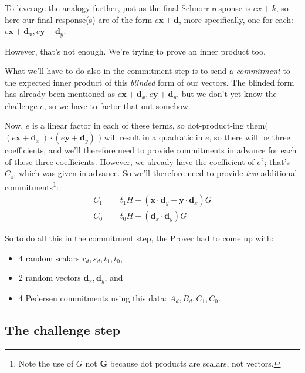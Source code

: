 \documentclass[10pt,a4paper]{article}
\begin{document}
To leverage the analogy further, just as the final Schnorr response is $ex+k$,
so here our final response(s) are of the form $e\mathbf{x}+\mathbf{d}$, more specifically, one for each: $e\mathbf{x} + \mathbf{d}_x, e\mathbf{y}+\mathbf{d}_y$.

However, that's not enough. We're trying to prove an inner product too.

What we'll have to do also in the commitment step is to send a
\emph{commitment} to the expected inner product of this \emph{blinded}
form of our vectors. The blinded form has already been mentioned as $e\mathbf{x} + \mathbf{d}_x, e\mathbf{y}+\mathbf{d}_y$,
but we don't yet know the challenge $e$, so we have to factor that out
somehow.

Now, $e$ is a linear factor in each of these terms, so dot-product-ing them($(e\mathbf{x} + \mathbf{d}_x\ )\cdot (e\mathbf{y} + \mathbf{d}_y)$
) will result in a quadratic in $e$, so there will be three coefficients,
and we'll therefore need to provide commitments in advance for each of
these three coefficients. However, we already have the coefficient of $e^2$;
that's $C_z$, which was given in advance. So we'll therefore need to provide
\emph{two} additional commitments\footnote{Note the use of $G$ not $\mathbf{G}$ because dot products are scalars, not vectors.}:
\begin{align}
C_1 &= t_1 H + \left(\mathbf{x} \cdot \mathbf{d}_y + \mathbf{y} \cdot \mathbf{d}_x\right)G \label{inner_product_proof_C0C1_def:0} \\
C_0 &= t_0 H + \left(\mathbf{d}_x \cdot \mathbf{d}_y \right)G  \label{inner_product_proof_C0C1_def:1}
\end{align}

So to do all this in the commitment step, the Prover had to come up with:

\begin{itemize}
\item 4 random scalars $r_d, s_d, t_1, t_0$,
\item 2 random vectors $\mathbf{d}_x, \mathbf{d}_y$, and 
\item 4 Pedersen commitments using this data: $A_d, B_d, C_1, C_0$.
\end{itemize}

\hypertarget{the-challenge-step}{%
\subsection[The challenge
step]{\texorpdfstring{\protect\hypertarget{anchor-37}{}{}The challenge
step}{The challenge step}}\label{the-challenge-step}}
\end{document}
